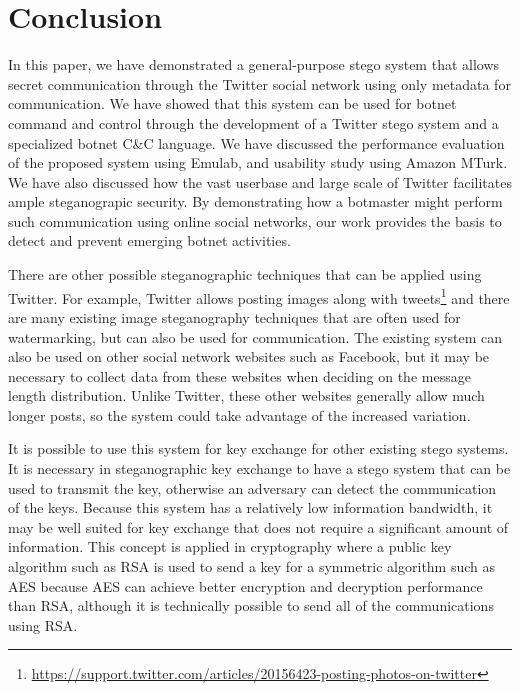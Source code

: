 \section{Conclusion}
\label{cha:conclusion}

In this paper, we have demonstrated a general-purpose stego system that allows secret communication through the
Twitter social network using only metadata for communication.  We have showed that this system can be used for
botnet command and control through the development of a Twitter stego system and a specialized botnet
C\&C language. 
We have discussed the performance evaluation of the proposed system using Emulab, 
and usability study using Amazon MTurk. We have also discussed how the vast 
userbase and large scale of Twitter facilitates ample steganograpic security.  
By demonstrating how a botmaster might perform
such communication using online social networks, our work provides the basis
to detect and prevent emerging botnet activities.

There are other possible steganographic techniques that can be applied using
Twitter.  For example, Twitter allows posting images along with
tweets\footnote{\url{https://support.twitter.com/articles/20156423-posting-photos-on-twitter}}
and there are many existing image steganography techniques \cite{watermarking}
that are often used for watermarking, but can also be used for communication.
The existing system can also be used on other social network websites such
as Facebook, but it may be necessary to collect data from these websites when
deciding on the message length distribution.  Unlike Twitter, these other
websites generally allow much longer posts, so the system could take advantage
of the increased variation.

It is possible to use this system for key exchange for other existing stego
systems.  It is necessary in steganographic key exchange to have a stego
system that can be used to transmit the key, otherwise an adversary can detect
the communication of the keys.  Because this system has a relatively low
information bandwidth, it may be well suited for key exchange that does not
require a significant amount of information.  This concept is applied in
cryptography where a public key algorithm such as RSA is used to send a
key for a symmetric algorithm such as AES because AES can achieve better
encryption and decryption performance than RSA, although it is technically
possible to send all of the communications using RSA.
